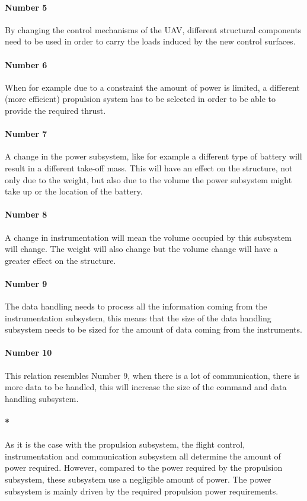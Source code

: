 \paragraph{Number 5} By changing the control mechanisms of the UAV, different structural components need to be used in order to carry the loads induced by the new control surfaces.


\paragraph{Number 6} When for example due to a constraint the amount of power is limited, a different (more efficient) propulsion system has to be selected in order to be able to provide the required thrust. 


\paragraph{Number 7} A change in the power subsystem, like for example a different type of battery will result in a different take-off mass. This will have an effect on the structure, not only due to the weight, but also due to the volume the power subsystem might take up or the location of the battery. 


\paragraph{Number 8} A change in instrumentation will mean the volume occupied by this subsystem will change. The weight will also change but the volume change will have a greater effect on the structure.


\paragraph{Number 9} The data handling needs to process all the information coming from the instrumentation subsystem, this means that the size of the data handling subsystem needs to be sized for the amount of data coming from the instruments.

\paragraph{Number 10} This relation resembles Number 9, when there is a lot of communication, there is more data to be handled, this will increase the size of the command and data handling subsystem.

\paragraph{*} As it is the case with the propulsion subsystem, the flight control, instrumentation and communication subsystem all determine the amount of power required. However, compared to the power required by the propulsion subsystem, these subsystem use a negligible amount of power. The power subsystem is mainly driven by the required propulsion power requirements. 

